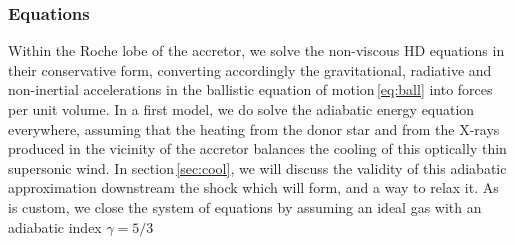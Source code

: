 \documentclass{aa}
\makeatletter
\newcommand*{\ie}{i.e.\@\xspace}
\makeatother
\begin{document}
\subsubsection{Equations}
\label{sec:HD_eq}

Within the Roche lobe of the accretor, we solve the non-viscous HD equations in their conservative form, converting accordingly the gravitational, radiative and non-inertial accelerations in the ballistic equation of motion\,\eqref{eq:ball} into forces per unit volume. In a first model, we do solve the adiabatic energy equation everywhere, assuming that the heating from the donor star and from the X-rays produced in the vicinity of the accretor balances the cooling of this optically thin supersonic wind. In section\,\ref{sec:cool}, we will discuss the validity of this adiabatic approximation downstream the shock which will form, and a way to relax it. As is custom, we close the system of equations by assuming an ideal gas with an adiabatic index $\gamma=5/3$
\end{document}
